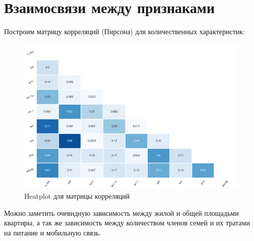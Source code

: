 \documentclass[12pt]{report}
\begin{document}
\section{Взаимосвязи между признаками}
Построим матрицу корреляций (Пирсона) для количественных характеристик:
\begin{figure}[H]
  \centering
  \includegraphics[scale=0.6]{title/corrlation.png}
  \caption{Heatplot для матрицы корреляций}
\end{figure}
Можно заметить очевидную зависимость между жилой и общей площадьми квартиры, а так же зависимость между количеством членов семей и их тратами на питание и мобильную связь.
\end{document}
